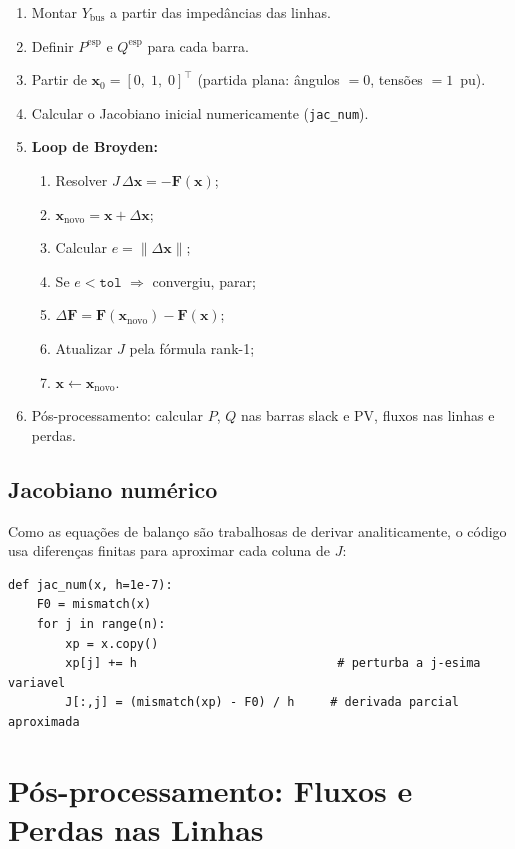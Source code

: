 \documentclass[
  12pt,
  a4paper,
  oneside,
  brazil
]{abntex2}
\begin{document}
\begin{enumerate}
  \item Montar $Y_{\text{bus}}$ a partir das impedâncias das linhas.
  \item Definir $P^{\text{esp}}$ e $Q^{\text{esp}}$ para cada barra.
  \item Partir de $\mathbf{x}_0 = [0,\;1,\;0]^\top$
        (partida plana: ângulos $= 0$, tensões $= 1$~pu).
  \item Calcular o Jacobiano inicial numericamente (\texttt{jac\_num}).
  \item \textbf{Loop de Broyden:}
    \begin{enumerate}
      \item Resolver $J\,\Delta\mathbf{x} = -\mathbf{F}(\mathbf{x})$;
      \item $\mathbf{x}_{\text{novo}} = \mathbf{x} + \Delta\mathbf{x}$;
      \item Calcular $e = \|\Delta\mathbf{x}\|$;
      \item Se $e < \texttt{tol}$ $\Rightarrow$ convergiu, parar;
      \item $\Delta\mathbf{F} = \mathbf{F}(\mathbf{x}_{\text{novo}}) - \mathbf{F}(\mathbf{x})$;
      \item Atualizar $J$ pela fórmula rank-1;
      \item $\mathbf{x} \leftarrow \mathbf{x}_{\text{novo}}$.
    \end{enumerate}
  \item Pós-processamento: calcular $P$, $Q$ nas barras slack e PV,
        fluxos nas linhas e perdas.
\end{enumerate}

\section{Jacobiano numérico}

Como as equações de balanço são trabalhosas de derivar analiticamente, o
código usa diferenças finitas para aproximar cada coluna de $J$:

\begin{lstlisting}
def jac_num(x, h=1e-7):
    F0 = mismatch(x)
    for j in range(n):
        xp = x.copy()
        xp[j] += h                            # perturba a j-esima variavel
        J[:,j] = (mismatch(xp) - F0) / h     # derivada parcial aproximada
\end{lstlisting}

\chapter{Pós-processamento: Fluxos e Perdas nas Linhas}
\end{document}

